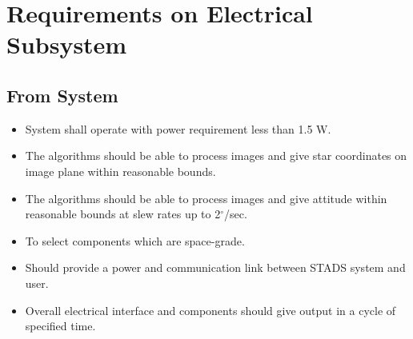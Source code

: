 \documentclass[../../main.tex]{subfiles}
\begin{document}


\newpage
\section{Requirements on Electrical Subsystem}
\subsection{From System}
\begin{itemize}
    \item System shall operate with power requirement less than 1.5 W.
    \item The algorithms should be able to process images and give star coordinates on image plane within reasonable bounds.
    \item The algorithms should be able to process images and give attitude within reasonable bounds at slew rates up to 2$^\circ$/sec.
    \item To select components which are space-grade.
    \item Should provide a power and communication link between STADS system and user.
    \item Overall electrical interface and components should give output in a cycle of specified time.
\end{itemize}
\end{document}
